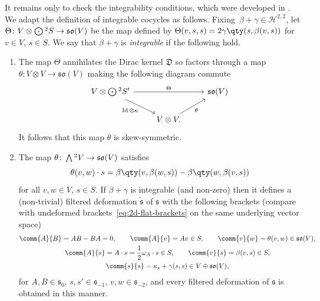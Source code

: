 \documentclass[pdftex]{sigma}
\numberwithin{equation}{section}
\newcommand{\fs}{\mathfrak{s}}
\newcommand{\fso}{\mathfrak{so}}
\newcommand{\fD}{\mathfrak{D}}
\newcommand{\cH}{\mathcal{H}}
\newcommand{\fstilde}{\widetilde{\fs}}
\newcommand{\Wedge}{\mathchoice{{\textstyle\bigwedge}}{\bigwedge}{\bigwedge}{\bigwedge}}	%
\newcommand{\Odot}{\mathchoice{{\textstyle\bigodot}}{\bigodot}{\bigodot}{\bigodot}}
\newcommand{\1}{\mathbbm{1}}
\DeclareMathOperator{\Id}{Id}
\begin{document}
It remains only to check the integrability conditions, which were developed in \cite[Section~4.4.2]{Beckett2024_2}. We adapt the definition of integrable cocycles \cite[Definition~4.23]{Beckett2024_2} as follows. Fixing~${\beta+\gamma\in\cH^{2,2}}$, let $\Theta\colon V\otimes\Odot^2S\to\fso(V) $ be the map defined by
$\Theta(v,s,s) = 2\gamma\qty(s,\beta(v,s))
$
for~${v\in V}$, $s\in S$. We say that $\beta+\gamma$ is \emph{integrable} if the following hold.
\begin{enumerate}\itemsep=0pt
	\item The map $\Theta$ annihilates the Dirac kernel $\fD$ so factors through a map $\theta\colon V\otimes V\to\fso(V)$ making the following diagram commute
	\[%
	\begin{tikzcd}
		V\otimes \Odot^2 S' \ar[rr,"\Theta"]\ar[rd,"\Id\otimes \kappa"'] & & \fso(V)\\
			& V \otimes V \ar[ru,"\theta"']. &
	\end{tikzcd}
	\]
	It follows that this map $\theta$ is skew-symmetric.
	\item The map $\theta\colon \Wedge^2 V\to \fso(V)$ satisfies
	\[%
		\theta(v,w)\cdot s
		= \beta\qty(v,\beta(w,s)) - \beta\qty(w,\beta(v,s))
	\]
	for all $v,w\in V$, $s\in S$.
If $\beta+\gamma$ is integrable (and non-zero) then it defines a (non-trivial) filtered deformation $\fstilde$ of $\fs$ with the following brackets (compare with undeformed brackets~\eqref{eq:2d-flat-brackets} on the same underlying vector space)
\begin{gather}
		\comm{A}{B} = AB-BA=0,\qquad
		 \comm{A}{v} = Av \in S,\qquad
		\comm{v}{w} = \theta(v,w) \in\fso(V),\nonumber	\\
		\comm{A}{s} = A\cdot s=\frac{1}{2}\omega_A\cdot s \in S,\qquad
		 \comm{v}{s} = \beta(v,s) \in S,\nonumber\\
		 \comm{s}{s}= \kappa_s + \gamma(s,s) \in V\oplus\fso(V),\label{eq:2d-deformed-brackets}
\end{gather}
for $A,B\in\fs_0$, $s,s'\in\fs_{-1}$, $v,w\in\fs_{-2}$, and every filtered deformation of $\fs$ is obtained in this manner.
	\end{enumerate}
\end{document}
